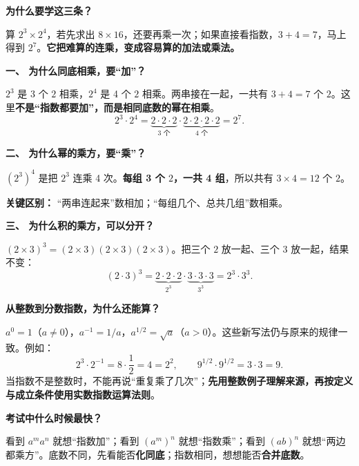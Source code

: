 \begin{explanationbox}
    \textbf{\textcolor{CExplanation}{为什么要学这三条？}}\par
    算 $2^3\times2^4$，若先求出 $8\times16$，还要再乘一次；如果直接看指数，$3+4=7$，马上得到 $2^7$。\textbf{它把难算的连乘，变成容易算的加法或乘法。}

    \medskip
    \textbf{\textcolor{CExplanation}{一、 为什么同底相乘，要“加”？}}\par
    $2^3$ 是 3 个 $2$ 相乘，$2^4$ 是 4 个 $2$ 相乘。两串接在一起，一共有 $3+4=7$ 个 $2$。这里\textbf{不是“指数都要加”，而是相同底数的幂在相乘}。
    \[2^3\cdot2^4=\underbrace{2\cdot2\cdot2}_{3\text{ 个}}\cdot\underbrace{2\cdot2\cdot2\cdot2}_{4\text{ 个}}=2^7.\]

    \medskip
    \textbf{\textcolor{CExplanation}{二、 为什么幂的乘方，要“乘”？}}\par
    $(2^3)^4$ 是把 $2^3$ 连乘 4 次。\textbf{每组 3 个 $2$，一共 4 组}，所以共有 $3\times4=12$ 个 $2$。
    \begin{center}
    
    \end{center}
    \textbf{关键区别：} “两串连起来”数相加；“每组几个、总共几组”数相乘。

    \medskip
    \textbf{\textcolor{CExplanation}{三、 为什么积的乘方，可以分开？}}\par
    $(2\times3)^3=(2\times3)(2\times3)(2\times3)$。把三个 $2$ 放一起、三个 $3$ 放一起，结果不变：
    \[(2\cdot3)^3=\underbrace{2\cdot2\cdot2}_{2^3}\cdot\underbrace{3\cdot3\cdot3}_{3^3}=2^3\cdot3^3.\]
    \begin{center}
    
    \end{center}

    \textbf{\textcolor{CExplanation}{从整数到分数指数，为什么还能算？}}\par
    $a^0=1$（$a\ne0$），$a^{-1}=1/a$，$a^{1/2}=\sqrt a$（$a>0$）。这些新写法仍与原来的规律一致。例如：
    \[2^3\cdot2^{-1}=8\cdot\frac12=4=2^2,\qquad 9^{1/2}\cdot9^{1/2}=3\cdot3=9.\]
    当指数不是整数时，不能再说“重复乘了几次”；\textbf{先用整数例子理解来源，再按定义与成立条件使用实数指数运算法则}。

    \medskip
    \textbf{\textcolor{CExplanation}{考试中什么时候最快？}}\par
    看到 $a^m a^n$ 就想“指数加”；看到 $(a^m)^n$ 就想“指数乘”；看到 $(ab)^n$ 就想“两边都乘方”。底数不同，先看能否\textbf{化同底}；指数相同，想想能否\textbf{合并底数}。
\end{explanationbox}
